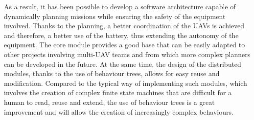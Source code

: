 As a result, it has been possible to develop a software architecture capable of dynamically planning missions while ensuring the safety of the equipment involved. Thanks to the planning, a better coordination of the UAVs is achieved and therefore, a better use of the battery, thus extending the autonomy of the equipment. The core module provides a good base that can be easily adapted to other projects involving multi-UAV teams and from which more complex planners can be developed in the future. At the same time, the design of the distributed modules, thanks to the use of behaviour trees, allows for easy reuse and modification. Compared to the typical way of implementing such modules, which involves the creation of complex finite state machines that are difficult for a human to read, reuse and extend, the use of behaviour trees is a great improvement and will allow the creation of increasingly complex behaviours.

